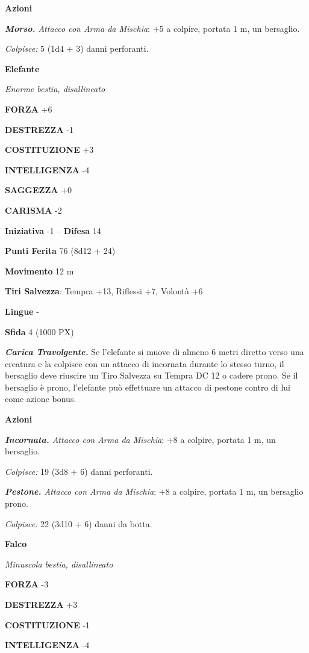 \begin{multicols}{2}
	\textbf{Azioni}

	\textit{\textbf{Morso.} Attacco con Arma da Mischia}: +5 a colpire, portata 1 m, un bersaglio.

	\textit{Colpisce:} 5 (1d4 + 3) danni perforanti.

	\medskip\textbf{Elefante}

	\textit{Enorme bestia, disallineato}

	\textbf{FORZA} +6

	\textbf{DESTREZZA} -1

	\textbf{COSTITUZIONE} +3

	\textbf{INTELLIGENZA} -4

	\textbf{SAGGEZZA} +0

	\textbf{CARISMA} -2

	\textbf{Iniziativa} -1 -- \textbf{Difesa} 14

	\textbf{Punti Ferita} 76 (8d12 + 24)

	\textbf{Movimento} 12 m

	\textbf{Tiri Salvezza}: Tempra +13, Riflessi +7, Volontà +6

	\textbf{Lingue} -

	\textbf{Sfida} 4 (1000 PX)

	\textit{\textbf{Carica Travolgente.}} Se l'elefante si muove di almeno 6 metri diretto verso una creatura e la colpisce con un attacco di incornata durante lo stesso turno, il bersaglio deve riuscire un Tiro Salvezza su Tempra DC 12 o cadere prono. Se il bersaglio è prono, l'elefante può effettuare un attacco di pestone contro di lui come azione bonus.

	\textbf{Azioni}

	\textit{\textbf{Incornata.} Attacco con Arma da Mischia}: +8 a colpire, portata 1 m, un bersaglio.

	\textit{Colpisce:} 19 (3d8 + 6) danni perforanti.

	\textit{\textbf{Pestone.} Attacco con Arma da Mischia}: +8 a colpire, portata 1 m, un bersaglio prono.

	\textit{Colpisce:} 22 (3d10 + 6) danni da botta.

	\medskip\textbf{Falco}

	\textit{Minuscola bestia, disallineato}

	\textbf{FORZA} -3

	\textbf{DESTREZZA} +3

	\textbf{COSTITUZIONE} -1

	\textbf{INTELLIGENZA} -4


\end{multicols}
